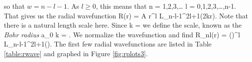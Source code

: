 so that $w = n - l - 1$. As $l\geq0$, this means that 
\beq
n = 1,2,3,\ldots {} l = 0,1,2,3,\ldots,n-1.
\eeq
That gives us the radial wavefunction
\beq
R(r) = A r^l L_{n-l-1}^{2l+1}(2kr).
\eeq
Note that there is a natural length scale here. Since
\beq
k = 
\eeq
we define the scale, known as the {\em Bohr radius}
\beq
a_0 \equiv {}  k = .
\eeq
We normalize the wavefunction and find 
\beq
R_{nl}(r) = \left(\right)^l L_{n-l-1}^{2l+1}\left(\right).
\label{eq:radialr}
\eeq
The first few radial wavefunctions are listed in Table \ref{table:rwave} and graphed in Figure \ref{fig:rplots3}.

